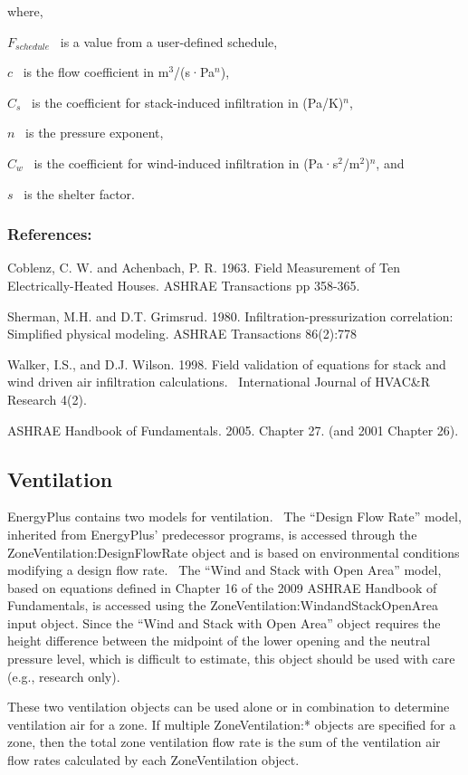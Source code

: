 where,

\({F_{schedule}}\) ~is a value from a user-defined schedule,

\(c\) ~is the flow coefficient in m\(^{3}\)/(s·Pa\(^{n}\)),

\({C_s}\) ~is the coefficient for stack-induced infiltration in (Pa/K)\(^{n}\),

\(n\) ~is the pressure exponent,

\({C_w}\) ~is the coefficient for wind-induced infiltration in (Pa·s\(^{2}\)/m\(^{2}\))\(^{n}\), and

\(s\) ~is the shelter factor.

\subsubsection{References:}\label{references-031}

Coblenz, C. W. and Achenbach, P. R. 1963. Field Measurement of Ten Electrically-Heated Houses. ASHRAE Transactions pp 358-365.

Sherman, M.H. and D.T. Grimsrud. 1980. Infiltration-pressurization correlation: Simplified physical modeling. ASHRAE Transactions 86(2):778

Walker, I.S., and D.J. Wilson. 1998. Field validation of equations for stack and wind driven air infiltration calculations.~ International Journal of HVAC\&R Research 4(2).

ASHRAE Handbook of Fundamentals. 2005. Chapter 27. (and 2001 Chapter 26).

\subsection{Ventilation}\label{ventilation}

EnergyPlus contains two models for ventilation.~ The ``Design Flow Rate'' model, inherited from EnergyPlus' predecessor programs, is accessed through the ZoneVentilation:DesignFlowRate object and is based on environmental conditions modifying a design flow rate.~ The ``Wind and Stack with Open Area'' model, based on equations defined in Chapter 16 of the 2009 ASHRAE Handbook of Fundamentals, is accessed using the ZoneVentilation:WindandStackOpenArea input object. Since the ``Wind and Stack with Open Area'' object requires the height difference between the midpoint of the lower opening and the neutral pressure level, which is difficult to estimate, this object should be used with care (e.g., research only).

These two ventilation objects can be used alone or in combination to determine ventilation air for a zone. If multiple ZoneVentilation:* objects are specified for a zone, then the total zone ventilation flow rate is the sum of the ventilation air flow rates calculated by each ZoneVentilation object.

